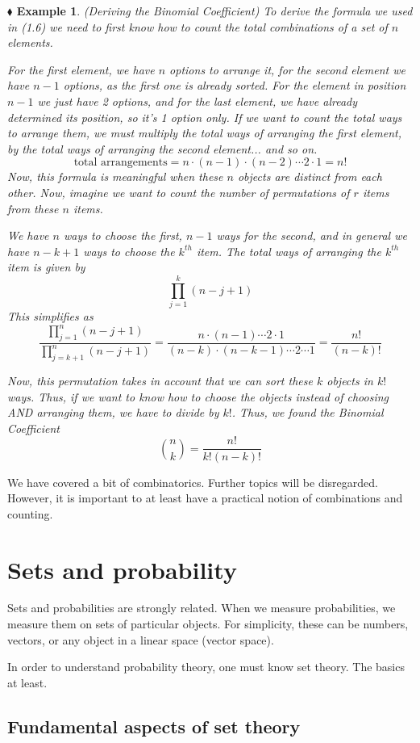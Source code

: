 \documentclass{report}
\newtheorem{example}{$\blacklozenge$ Example}[chapter]
\begin{document}
\begin{example}(Deriving the Binomial Coefficient)
    To derive the formula we used in (1.6) we need to first know how to count the total combinations of a set of 
    $n$ elements. 

    For the first element, we have $n$ options to arrange it, for the second element we have $n-1$ options, as the 
    first one is already sorted. For the element in position $n-1$ we just have 2 options, and for the last element,
    we have already determined its position, so it's 1 option only. If we want to count the total ways to arrange 
    them, we must multiply the total ways of arranging the first element, by the total ways of arranging the second 
    element... and so on. 
    \begin{equation}
        \text{total arrangements} = n\cdot(n-1)\cdot(n-2)\cdots 2 \cdot 1 = n!
    \end{equation}
    Now, this formula is meaningful when these $n$ objects are distinct from each other. Now, imagine we want to count 
    the number of permutations of $r$ items from these $n$ items. 
    
    We have $n$ ways to choose the first, $n-1$ ways for the second, and in general we have $n-k+1$ ways to choose the $k^{th}$
    item. The total ways of arranging the $k^{th}$ item is given by 
    \begin{equation}
        \prod_{j=1}^{k}(n-j+1)
    \end{equation}
    This simplifies as 
    \begin{equation}
        \frac{\prod_{j=1}^{n}{(n-j+1)}}{\prod_{j=k+1}^{n}{(n-j+1)}}=\frac{n\cdot(n-1)\cdots2\cdot1}{(n-k)\cdot(n-k-1)\cdots2\cdots1}=\frac{n!}{(n-k)!}
    \end{equation}
    
    Now, this permutation takes in account that we can sort these $k$ objects in $k!$ ways. Thus, if we want to know how to \textit{choose} the 
    objects instead of choosing AND arranging them, we have to divide by $k!$. Thus, we found the Binomial Coefficient
    \begin{equation}
        \binom{n}{k} = \frac{n!}{k!(n-k)!}
    \end{equation} 
\end{example}

We have covered a bit of combinatorics. Further topics will be disregarded. However, it is important to at least 
have a practical notion of combinations and counting.

\section{Sets and probability}
Sets and probabilities are strongly related. When we measure probabilities, we measure them on sets of particular 
objects. For simplicity, these can be numbers, vectors, or any object in a linear space (vector space).

In order to understand probability theory, one must know set theory. The basics at least.
\subsection{Fundamental aspects of set theory}
\end{document}
